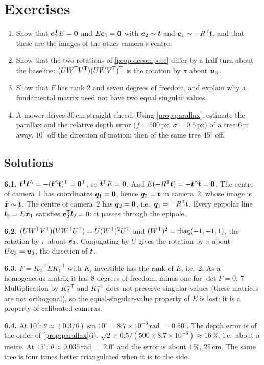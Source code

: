 \FloatBarrier
\section*{Exercises}

\begin{enumerate}[label=\textbf{6.\arabic*},ref=6.\arabic*]
\item\label{ex:6epi} Show that $\bm{e}_2^{\mathsf{T}} E=\bm{0}$ and $E\bm{e}_1=
  \bm{0}$ with $\bm{e}_2\sim\bm{t}$ and $\bm{e}_1\sim-R^{\mathsf{T}}\bm{t}$,
  and that these are the images of the other camera's centre.
\item\label{ex:6twist} Show that the two rotations of
  \cref{prop:decompose} differ by a half-turn about the baseline:
  $(UW^{\mathsf{T}} V^{\mathsf{T}})(UWV^{\mathsf{T}})^{\mathsf{T}}$ is the rotation by $\pi$ about $\bm{u}_3$.
\item\label{ex:6fdof} Show that $F$ has rank 2 and seven degrees of
  freedom, and explain why a fundamental matrix need not have two equal
  singular values.
\item\label{ex:6forward} A mower drives 30\,cm straight ahead. Using
  \cref{prop:parallax}, estimate the parallax and the relative depth
  error ($f=500$\,px, $\sigma=0.5$\,px) of a tree 6\,m away, $10^\circ$
  off the direction of motion; then of the same tree $45^\circ$ off.
\end{enumerate}

\subsection*{Solutions}

\textbf{6.1.} $\bm{t}^{\mathsf{T}}\bm{t}^{\wedge}=-(\bm{t}^{\wedge}\bm{t})^{\mathsf{T}}
=\bm{0}^{\mathsf{T}}$, so $\bm{t}^{\mathsf{T}} E=\bm{0}$. And
$E(-R^{\mathsf{T}}\bm{t})=-\bm{t}^{\wedge}\bm{t}=\bm{0}$. The centre of
camera~1 has coordinates $\bm{q}_1=\bm{0}$, hence $\bm{q}_2=
\bm{t}$ in camera~2, whose image is $\tilde{\bm{x}}\sim\bm{t}$.
The centre of camera~2 has $\bm{q}_2=\bm{0}$, i.e.\ $\bm{q}_1=
-R^{\mathsf{T}}\bm{t}$. Every epipolar line $\bm{l}_2=E\tilde{\bm{x}}_1$
satisfies $\bm{e}_2^{\mathsf{T}}\bm{l}_2=0$: it passes through the epipole.

\textbf{6.2.} $(UW^{\mathsf{T}} V^{\mathsf{T}})(VW^{\mathsf{T}} U^{\mathsf{T}})=U(W^{\mathsf{T}})^2U^{\mathsf{T}}$ and
$(W^{\mathsf{T}})^2=\operatorname{diag}(-1,-1,1)$, the rotation by $\pi$ about $\bm{e}_3$.
Conjugating by $U$ gives the rotation by $\pi$ about $U\bm{e}_3=
\bm{u}_3$, the direction of $\bm{t}$.

\textbf{6.3.} $F=K_2^{-\mathsf T}EK_1^{-1}$ with $K_i$ invertible has
the rank of $E$, i.e.\ 2. As a homogeneous matrix it has 8 degrees of
freedom, minus one for $\det F=0$: 7. Multiplication by $K_2^{-\mathsf
T}$ and $K_1^{-1}$ does not preserve singular values (these matrices are
not orthogonal), so the equal-singular-value property of $E$ is lost:
it is a property of calibrated cameras.

\textbf{6.4.} At $10^\circ$: $\theta\approx(0.3/6)\sin10^\circ=8.7
\times10^{-3}$\,rad $=0.50^\circ$. The depth error is of the order of
\cref{prop:parallax}(i), $\sqrt2\times0.5/(500\times8.7\times10^{-3})
\approx16\,\%$, i.e.\ about a metre. At $45^\circ$: $\theta\approx
0.035$\,rad $=2.0^\circ$ and the error is about $4\,\%$, 25\,cm. The same
tree is four times better triangulated when it is to the side.
